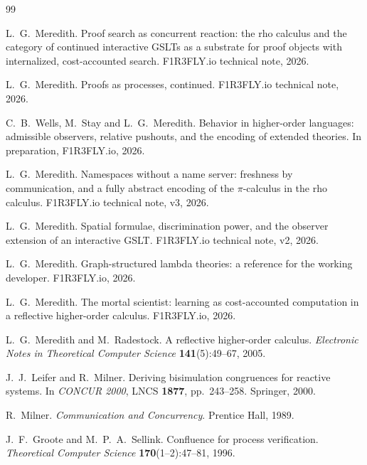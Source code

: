 \documentclass[11pt]{article}
\theoremstyle{plain}
\theoremstyle{definition}
\theoremstyle{remark}
\begin{document}
\begin{thebibliography}{99}

 L.~G.~Meredith.
\newblock Proof search as concurrent reaction: the rho calculus and the
category of continued interactive GSLTs as a substrate for proof objects with
internalized, cost-accounted search.
\newblock F1R3FLY.io technical note, 2026.

 L.~G.~Meredith.
\newblock Proofs as processes, continued.
\newblock F1R3FLY.io technical note, 2026.

 C.~B.~Wells, M.~Stay and L.~G.~Meredith.
\newblock Behavior in higher-order languages: admissible observers, relative
pushouts, and the encoding of extended theories.
\newblock In preparation, F1R3FLY.io, 2026.

 L.~G.~Meredith.
\newblock Namespaces without a name server: freshness by communication, and a
fully abstract encoding of the $\pi$-calculus in the rho calculus.
\newblock F1R3FLY.io technical note, v3, 2026.

 L.~G.~Meredith.
\newblock Spatial formulae, discrimination power, and the observer extension
of an interactive GSLT.
\newblock F1R3FLY.io technical note, v2, 2026.

 L.~G.~Meredith.
\newblock Graph-structured lambda theories: a reference for the working
developer.
\newblock F1R3FLY.io, 2026.

 L.~G.~Meredith.
\newblock The mortal scientist: learning as cost-accounted computation in a
reflective higher-order calculus.
\newblock F1R3FLY.io, 2026.

 L.~G.~Meredith and M.~Radestock.
\newblock A reflective higher-order calculus.
\newblock \emph{Electronic Notes in Theoretical Computer Science}
\textbf{141}(5):49--67, 2005.

 J.~J.~Leifer and R.~Milner.
\newblock Deriving bisimulation congruences for reactive systems.
\newblock In \emph{CONCUR 2000}, LNCS \textbf{1877}, pp.~243--258. Springer, 2000.

 R.~Milner.
\newblock \emph{Communication and Concurrency}.
\newblock Prentice Hall, 1989.

 J.~F.~Groote and M.~P.~A.~Sellink.
\newblock Confluence for process verification.
\newblock \emph{Theoretical Computer Science} \textbf{170}(1--2):47--81, 1996.


\end{thebibliography}
\end{document}
